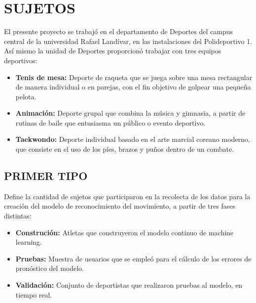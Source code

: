 \section{SUJETOS}
El presente proyecto se trabaj\'o en el departamento de Deportes del campus central de la universidad Rafael Land\'ivar, en las instalaciones del Polideportivo 1. As\'i mismo la unidad de Deportes proporcion\'o trabajar con tres equipos deportivos:
\begin{itemize}
	\item \textbf{Tenis de mesa:} Deporte de raqueta que se juega sobre una mesa rectangular de manera individual o en parejas, con el fin objetivo de golpear una peque\~na pelota.
	\item \textbf{Animaci\'on:} Deporte grupal que combina la m\'usica y gimnasia, a partir de rutinas de baile que entusiasma un p\'ublico o evento deportivo.
	\item \textbf{Taekwondo:} Deporte individual basado en el arte marcial coreano moderno, que consiste en el uso de los p\'ies, brazos y pu\~nos dentro de un combate.
\end{itemize}
\subsection{PRIMER TIPO} \label{sj:1t}
Define la cantidad de sujetos que participaron en la recolecta de los datos para la creaci\'on del modelo de reconocimiento del movimiento, a partir de tres fases distintas:
\begin{itemize}
	\item \textbf{Construci\'on:} Atletas que construyeron el modelo continuo de machine learning.
	\item \textbf{Pruebas:} Muestra de usuarios que se emple\'o para el c\'alculo de los errores de pron\'ostico del modelo.
	\item \textbf{Validaci\'on:} Conjunto de deportistas que realizaron pruebas al modelo, en tiempo real.
\end{itemize}

